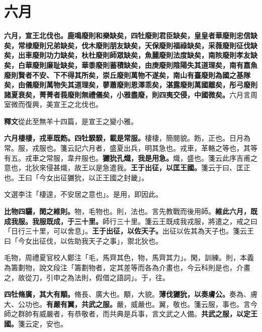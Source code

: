 \section{六月}


\textbf{六月，宣王北伐也。鹿鳴廢則和樂缺矣，四牡廢則君臣缺矣，皇皇者華廢則忠信缺矣，常棣廢則兄弟缺矣，伐木廢則朋友缺矣，天保廢則福祿缺矣，采薇廢則征伐缺矣，出車廢則功力缺矣，杕杜廢則師眾缺矣，魚麗廢則法度缺矣，南陔廢則孝友缺矣，白華廢則廉耻缺矣，華黍廢則蓄積缺矣，由庚廢則陰陽失其道理矣，南有嘉魚廢則賢者不安、下不得其所矣，崇丘廢則萬物不遂矣，南山有臺廢則為國之基隊矣，由儀廢則萬物失其道理矣，蓼蕭廢則恩澤乖矣，湛露廢則萬國離矣，彤弓廢則諸夏衰矣，菁菁者莪廢則無禮儀矣，小雅盡廢，則四夷交侵，中國微矣。}{\footnotesize 六月言周室微而復興，美宣王之北伐也。}

\begin{quoting}\textbf{釋文}從此至無羊十四篇，是宣王之變小雅。\end{quoting}

\textbf{六月棲棲，戎車既飭。四牡騤騤，載是常服。}{\footnotesize 棲棲，簡閱貌。飭，正也。日月為常。服，戎服也。箋云記六月者，盛夏出兵，明其急也。戎車，革輅之等也，其等有五。戎車之常服，韋弁服也。}\textbf{玁狁孔熾，我是用急。}{\footnotesize 熾，盛也。箋云此序吉甫之意也，北狄來侵甚熾，故王以是急遣我。}\textbf{王于出征，以匡王國。}{\footnotesize 箋云于曰、匡正也。王曰「今女出征玁狁，以正王國之封畿」。}

\begin{quoting}文選李注「棲遑，不安居之意也」。是用，即因此。\end{quoting}

\textbf{比物四驪，閑之維則。}{\footnotesize 物，毛物也。則，法也。言先教戰而後用師。}\textbf{維此六月，既成我服。我服既成，于三十里。}{\footnotesize 師行三十里。箋云王既成我戎服，將遣之，戒之曰「日行三十里，可以舍息」。}\textbf{王于出征，以佐天子。}{\footnotesize 出征以佐其為天子也。箋云王曰「今女出征伐，以佐助我天子之事」，禦北狄也。}

\begin{quoting}毛物，周禮夏官校人鄭注「毛，馬齊其色，物，馬齊其力」。閑，訓練。則，本義為籌劃物，說文段注「籌劃物者，定其差等而各為介畫也，今云科則是也，介畫之，故從刀，引申之為法則，假借之語詞」。于，往。\end{quoting}

\textbf{四牡脩廣，其大有顒。}{\footnotesize 脩長、廣大也。顒，大貌。}\textbf{薄伐玁狁，以奏膚公。}{\footnotesize 奏為、膚大、公功也。}\textbf{有嚴有翼，共武之服。}{\footnotesize 嚴，威嚴也。翼，敬也。箋云服，事也。言今師之群帥有威嚴者，有恭敬者，而共典是兵事，言文武之人備。}\textbf{共武之服，以定王國。}{\footnotesize 箋云定，安也。}


